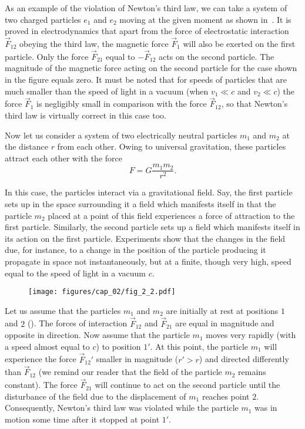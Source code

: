 As an example of the violation of Newton's third law, we can take a system of two charged particles $e_1$ and $e_2$ moving at the given moment as shown in~. It is proved in electrodynamics that apart from the force of electrostatic interaction $\vec{F}_{12}$ obeying the third law, the magnetic force $\vec{F}_1$ will also be exerted on the first particle. Only the force $\vec{F}_{21}$ equal to $-\vec{F}_{12}$ acts on the second particle. The magnitude of the magnetic force acting on the second particle for the case shown in the figure equals zero. It must be noted that for speeds of particles that are much smaller than the speed of light in a vacuum (when $v_1\ll c$ and $v_2\ll c$) the force $\vec{F}_1$ is negligibly small in comparison with the force $\vec{F}_{12}$, so that Newton's third law is virtually correct in this case too.

Now let us consider a system of two electrically neutral particles $m_1$ and $m_2$ at the distance $r$ from each other. Owing to universal gravitation, these particles attract each other with the force
\vspace*{2pt}
\begin{equation}\label{eq:2_18}
F = G\frac{m_1 m_2}{r^2}.
\end{equation}

\noindent
In this case, the particles interact via a gravitational field. Say, the first particle sets up in the space surrounding it a field which manifests itself in that the particle $m_2$ placed at a point of this field experiences a force of attraction to the first particle. Similarly, the second particle sets up a field which manifests itself in its action on the first particle. Experiments show that the changes in the field due, for instance, to a change in the position of the particle producing it propagate in space not instantaneously, but at a finite, though very high, speed equal to the speed of light in a vacuum $c$.

\begin{figure}[t]
	\begin{center}
		\texttt{[image: figures/cap\_02/fig\_2\_2.pdf]}
		\caption[]{}
		\label{fig:2_2}
	\end{center}
\vspace{-0.7cm}
\end{figure}

Let us assume that the particles $m_1$ and $m_2$ are initially at rest at positions $1$ and $2$ (). The forces of interaction $\vec{F}_{12}$ and $\vec{F}_{21}$ are equal in magnitude and opposite in direction. Now assume that the particle $m_1$ moves very rapidly (with a speed almost equal to $c$) to position $1'$. At this point, the particle $m_1$ will experience the force $\vec{F}_{12}'$ smaller in magnitude ($r'>r$) and directed differently than $\vec{F}_{12}$ (we remind our reader that the field of the particle $m_2$ remains constant). The force $\vec{F}_{21}$ will continue to act on the second particle until the disturbance of the field due to the displacement of $m_1$ reaches point $2$. Consequently, Newton's third law was violated while the particle $m_1$ was in motion some time after it stopped at point $1'$.

